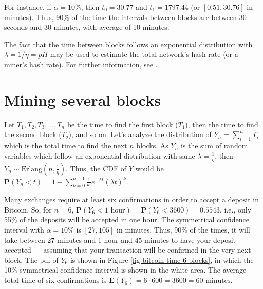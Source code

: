 For instance, if $\alpha = 10\%$, then $t_0 = 30.77$ and $t_1 = 1797.44$ (or $[0.51, 30.76]$ in minutes). Thus, 90\% of the time the intervals between blocks are between 30 seconds and 30 minutes, with average of 10 minutes.

The fact that the time between blocks follows an exponential distribution with $\lambda = 1/\eta = pH$ may be used to estimate the total network's hash rate (or a miner's hash rate). For further information, see \cite{ozisikestimation}.


\section{Mining several blocks}

Let $T_1, T_2, T_3, \dots, T_n$ be the time to find the first block ($T_1$), then the time to find the second block ($T_2$), and so on. Let's analyze the distribution of $Y_n = \sum_{i=1}^{n} T_i$ which is the total time to find the next $n$ blocks. As $Y_n$ is the sum of random variables which follow an exponential distribution with same $\lambda = \frac{1}{\eta}$, then $Y_n \sim \text{Erlang}(n, \frac{1}{\eta})$. Thus, the CDF of $Y$ would be $\mathbf{P}(Y_n < t) = 1 - \sum_{k=0}^{n-1} \frac{1}{k!} e^{-\lambda t} (\lambda t)^k$.

Many exchanges require at least six confirmations in order to accept a deposit in Bitcoin. So, for $n=6$, $\mathbf{P}(Y_6 < 1 \text{ hour}) = \mathbf{P}(Y_6 < 3600) = 0.5543$, i.e., only 55\% of the deposits will be accepted in one hour. The symmetrical confidence interval with $\alpha=10\%$ is $[27, 105]$ in minutes. Thus, 90\% of the times, it will take between 27 minutes and 1 hour and 45 minutes to have your deposit accepted --- assuming that your transaction will be confirmed in the very next block. The pdf of $Y_6$ is shown in Figure \ref{fig-bitcoin-time-6-blocks}, in which the 10\% symmetrical confidence interval is shown in the white area. The average total time of six confirmations is $\mathbf{E}(Y_6) = 6 \cdot 600 = 3600 = 60 \text{ minutes}$.

